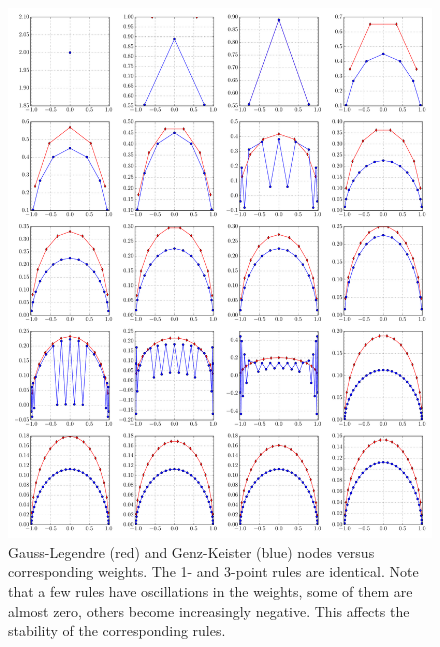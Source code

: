 \documentclass[a4paper,10pt]{article}
\begin{document}
\begin{figure}[h]
  \centering
  \includegraphics[width=\linewidth]{./img/gk_legendre_nodes_1d.pdf}
  \caption{Gauss-Legendre (red) and Genz-Keister (blue) nodes versus
  corresponding weights. The 1- and 3-point rules are identical.
  Note that a few rules have oscillations in the weights, some of them
  are almost zero, others become increasingly negative. This affects the
  stability of the corresponding rules.}
  \label{fig:gk_legendre_nodes_1d}
\end{figure}
\end{document}
